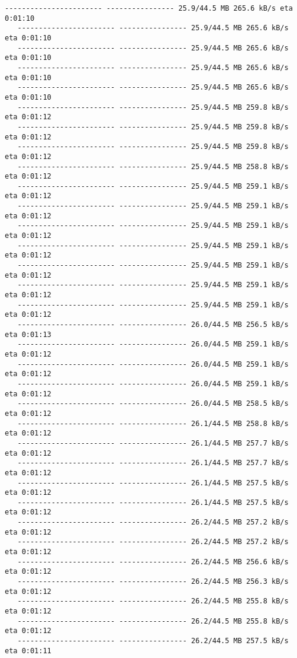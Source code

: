 \documentclass[11pt]{article}
\begin{document}
\begin{Verbatim}[commandchars=\\\{\}]
   ----------------------- ---------------- 25.9/44.5 MB 265.6 kB/s eta 0:01:10
   ----------------------- ---------------- 25.9/44.5 MB 265.6 kB/s eta 0:01:10
   ----------------------- ---------------- 25.9/44.5 MB 265.6 kB/s eta 0:01:10
   ----------------------- ---------------- 25.9/44.5 MB 265.6 kB/s eta 0:01:10
   ----------------------- ---------------- 25.9/44.5 MB 265.6 kB/s eta 0:01:10
   ----------------------- ---------------- 25.9/44.5 MB 259.8 kB/s eta 0:01:12
   ----------------------- ---------------- 25.9/44.5 MB 259.8 kB/s eta 0:01:12
   ----------------------- ---------------- 25.9/44.5 MB 259.8 kB/s eta 0:01:12
   ----------------------- ---------------- 25.9/44.5 MB 258.8 kB/s eta 0:01:12
   ----------------------- ---------------- 25.9/44.5 MB 259.1 kB/s eta 0:01:12
   ----------------------- ---------------- 25.9/44.5 MB 259.1 kB/s eta 0:01:12
   ----------------------- ---------------- 25.9/44.5 MB 259.1 kB/s eta 0:01:12
   ----------------------- ---------------- 25.9/44.5 MB 259.1 kB/s eta 0:01:12
   ----------------------- ---------------- 25.9/44.5 MB 259.1 kB/s eta 0:01:12
   ----------------------- ---------------- 25.9/44.5 MB 259.1 kB/s eta 0:01:12
   ----------------------- ---------------- 25.9/44.5 MB 259.1 kB/s eta 0:01:12
   ----------------------- ---------------- 26.0/44.5 MB 256.5 kB/s eta 0:01:13
   ----------------------- ---------------- 26.0/44.5 MB 259.1 kB/s eta 0:01:12
   ----------------------- ---------------- 26.0/44.5 MB 259.1 kB/s eta 0:01:12
   ----------------------- ---------------- 26.0/44.5 MB 259.1 kB/s eta 0:01:12
   ----------------------- ---------------- 26.0/44.5 MB 258.5 kB/s eta 0:01:12
   ----------------------- ---------------- 26.1/44.5 MB 258.8 kB/s eta 0:01:12
   ----------------------- ---------------- 26.1/44.5 MB 257.7 kB/s eta 0:01:12
   ----------------------- ---------------- 26.1/44.5 MB 257.7 kB/s eta 0:01:12
   ----------------------- ---------------- 26.1/44.5 MB 257.5 kB/s eta 0:01:12
   ----------------------- ---------------- 26.1/44.5 MB 257.5 kB/s eta 0:01:12
   ----------------------- ---------------- 26.2/44.5 MB 257.2 kB/s eta 0:01:12
   ----------------------- ---------------- 26.2/44.5 MB 257.2 kB/s eta 0:01:12
   ----------------------- ---------------- 26.2/44.5 MB 256.6 kB/s eta 0:01:12
   ----------------------- ---------------- 26.2/44.5 MB 256.3 kB/s eta 0:01:12
   ----------------------- ---------------- 26.2/44.5 MB 255.8 kB/s eta 0:01:12
   ----------------------- ---------------- 26.2/44.5 MB 255.8 kB/s eta 0:01:12
   ----------------------- ---------------- 26.2/44.5 MB 257.5 kB/s eta 0:01:11

\end{Verbatim}
\end{document}
